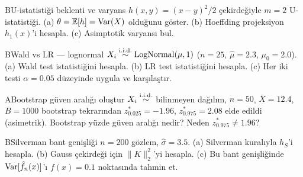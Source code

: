 \begin{alistirma}[Al.18.2]{B}{U-istatistiği beklenti ve varyans}
$h(x,y) = (x-y)^2/2$ çekirdeğiyle $m=2$ U-istatistiği. (a) $\theta=\mathbb{E}[h]=\operatorname{Var}(X)$ olduğunu göster. (b) Hoeffding projeksiyon $h_1(x)$'i hesapla. (c) Asimptotik varyansı bul.
\end{alistirma}


\begin{alistirma}[Al.18.3a]{B}{Wald vs LR --- lognormal}
$X_i\overset{\text{i.i.d.}}{\sim}\mathrm{LogNormal}(\mu,1)$ ($n=25$, $\hat\mu=2.3$, $\mu_0=2.0$). (a) Wald test istatistiğini hesapla. (b) LR test istatistiğini hesapla. (c) Her iki testi $\alpha=0.05$ düzeyinde uygula ve karşılaştır.
\end{alistirma}
\begin{alistirma}[Al.18.3b]{A}{Bootstrap güven aralığı oluştur}
$X_i\overset{\text{i.i.d.}}{\sim}$ bilinmeyen dağılım, $n=50$, $\bar X=12.4$, $B=1000$ bootstrap tekrarından $z_{0.025}^*=-1.96$, $z_{0.975}^*=2.08$ elde edildi (asimetrik). Bootstrap yüzde güven aralığı nedir? Neden $z^*_{0.975}\neq 1.96$?
\end{alistirma}
\begin{alistirma}[Al.18.3c]{B}{Silverman bant genişliği}
$n=200$ gözlem, $\hat\sigma=3.5$. (a) Silverman kuralıyla $h_S$'i hesapla. (b) Gauss çekirdeği için $\|K\|_2^2$'yi hesapla. (c) Bu bant genişliğinde $\operatorname{Var}[\hat f_n(x)]$'ı $f(x)=0.1$ noktasında tahmin et.
\end{alistirma}
